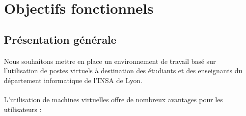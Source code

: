 \section{Objectifs fonctionnels}

\subsection{Présentation générale}

\paragraph{} Nous souhaitons mettre en place un environnement de travail basé
sur l'utilisation de postes virtuels à destination des étudiants et des
enseignants du département informatique de l'INSA de Lyon.

\paragraph{} L'utilisation de machines virtuelles offre de nombreux avantages
pour les utilisateurs :

